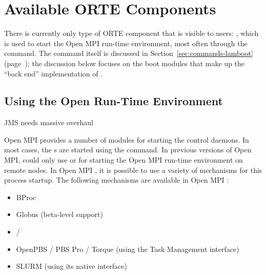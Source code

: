 %
% 
% 
%

\chapter{Available ORTE Components}
\label{sec:mca-orte}

There is currently only type of ORTE component that is visible to
users: , which is used to start the Open MPI run-time
environment, most often through the  command.  The
 command itself is discussed in
Section~\ref{sec:commands-lamboot}
(page~\pageref{sec:commands-lamboot}); the discussion below focuses on
the boot modules that make up the ``back end'' implementation of
.


\section{Using the Open Run-Time Environment}
\label{sec:mca-orte-pls}

{\Huge JMS needs massive overhaul}

Open MPI provides a number of modules for starting the 
control daemons.  In most cases, the s are started using the
 command.  In previous versions of Open MPI,
 could only use  or  for starting
the Open MPI run-time environment on remote nodes.  In Open MPI
\ompiversion, it is possible to use a variety of mechanisms for this
process startup.  The following mechanisms are available in Open MPI
\ompiversion:

\begin{itemize}
\item BProc
\item Globus (beta-level support)
\item {} / 
\item OpenPBS / PBS Pro / Torque (using the Task Management interface)
\item SLURM (using its native interface)
\end{itemize}


